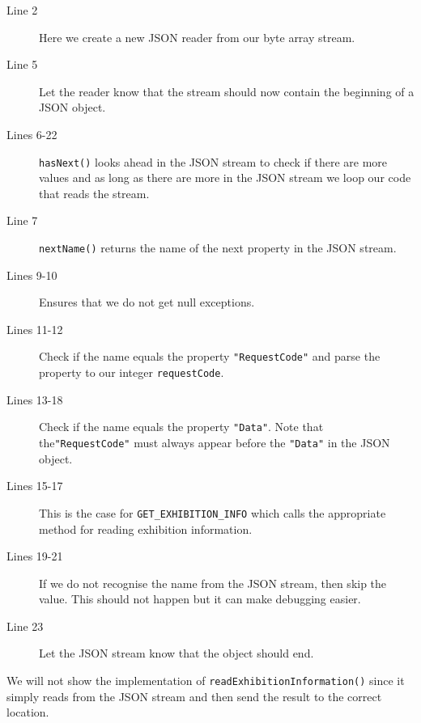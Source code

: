 \begin{description}
\item[Line 2] Here we create a new JSON reader from our byte array stream.
\item[Line 5] Let the reader know that the stream should now contain the beginning of a JSON object.
\item[Lines 6-22] \lstinline|hasNext()| looks ahead in the JSON stream to check if there are more values and as long as there are more in the JSON stream we loop our code that reads the stream.
\item[Line 7] \lstinline|nextName()| returns the name of the next property in the JSON stream.
\item[Lines 9-10] Ensures that we do not get null exceptions.
\item[Lines 11-12] Check if the name equals the property \lstinline|"RequestCode"| and parse the property to our integer \lstinline|requestCode|.
\item[Lines 13-18] Check if the name equals the property \lstinline|"Data"|. Note that the\linebreak \lstinline|"RequestCode"| must always appear before the \lstinline|"Data"| in the JSON object.
\item[Lines 15-17] This is the case for \lstinline|GET_EXHIBITION_INFO| which calls the appropriate method for reading exhibition information.
\item[Lines 19-21] If we do not recognise the name from the JSON stream, then skip the value. This should not happen but it can make debugging easier.
\item[Line 23] Let the JSON stream know that the object should end.
\end{description}
We will not show the implementation of \lstinline|readExhibitionInformation()| since it simply reads from the JSON stream and then send the result to the correct location.
